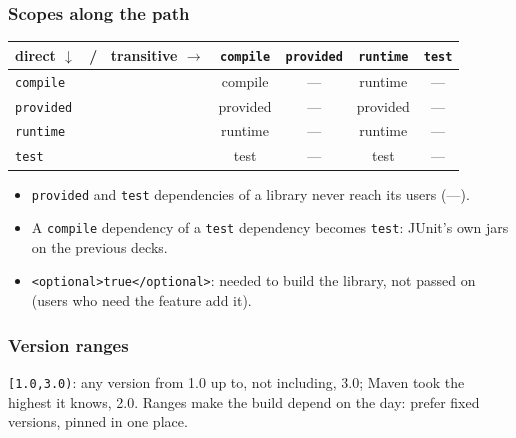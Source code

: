 \documentclass[aspectratio=169,10pt,compress]{beamer}
\begin{document}
\begin{frame}[t,fragile] \frametitle{Scopes along the path}
  \begin{center}\small
  \begin{tabular}{@{}lcccc@{}}
    \toprule
    \textbf{direct $\downarrow$ \ / \ transitive $\rightarrow$} & \texttt{compile} & \texttt{provided} & \texttt{runtime} & \texttt{test} \\
    \midrule
    \texttt{compile}    & compile  & --- & runtime & --- \\
    \texttt{provided}   & provided & --- & provided & --- \\
    \texttt{runtime}    & runtime  & --- & runtime & --- \\
    \texttt{test}       & test     & --- & test    & --- \\
    \bottomrule
  \end{tabular}
  \end{center}
  \begin{itemize}\small
    \item \texttt{provided} and \texttt{test} dependencies of a library never reach its users (---).
    \item A \texttt{compile} dependency of a \texttt{test} dependency becomes \texttt{test}: JUnit's own jars on the previous decks.
    \item \texttt{<optional>true</optional>}: needed to build the library, not passed on (users who need the feature add it).
  \end{itemize}
\end{frame}




\begin{frame}[t,fragile] \frametitle{Version ranges}

  \vspace{0.1em}
  \small
  \texttt{[1.0,3.0)}: any version from 1.0 up to, not including, 3.0; Maven took the highest it knows, 2.0. Ranges make the build depend on the day: prefer fixed versions, pinned in one place.
\end{frame}
\end{document}
